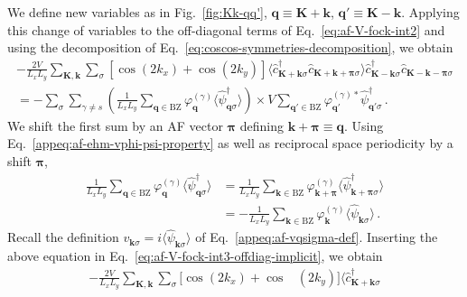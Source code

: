 \begin{tabproof}
	
	We define new variables as in Fig.~\ref{fig:Kk-qq'}, $\mathbf{q}\equiv\mathbf{K}+\mathbf{k}$, $\mathbf{q}'\equiv\mathbf{K}-\mathbf{k}$.
	Applying this change of variables to the off-diagonal terms of Eq.~\eqref{eq:af-V-fock-int2} and using the decomposition of Eq.~\eqref{eq:coscos-symmetries-decomposition}, we obtain
	\begin{multline}
		-\frac{2V}{L_x L_y} \sum_{\mathbf{K}, \mathbf{k}} \sum_\sigma [
		\cos \left(
		2k_x
		\right)	+ \cos \left(
		2k_y
		\right)	
		] \langle
		\hat c_{\mathbf{K}+\mathbf{k} \sigma}^\dagger 
		\hat c_{\mathbf{K}+\mathbf{k}+\bm{\pi} \sigma}
		\rangle
		\hat c_{\mathbf{K}-\mathbf{k} \sigma}^\dagger \hat c_{\mathbf{K}-\mathbf{k}-\bm{\pi} \sigma} \\
		= -\sum_\sigma \sum_{\gamma \neq s} \left(
		\frac{1}{L_x L_y} \sum_{\mathbf{q}\in\mathrm{BZ}} \varphi_\mathbf{q}^{(\gamma)}
		\langle
		\hat \psi_{\mathbf{q}\sigma}^\dagger
		\rangle
		\right) \times V
		\sum_{\mathbf{q}'\in\mathrm{BZ}}
		\varphi_{\mathbf{q}'}^{(\gamma)*}
		\hat \psi_{\mathbf{q}'\sigma}^\dagger \, . \label{eq:af-V-fock-int3-offdiag-implicit}
	\end{multline}
	We shift the first sum by an AF vector $\bm{\pi}$ defining $\mathbf{k}+\bm{\pi}\equiv\mathbf{q}$. Using Eq.~\eqref{appeq:af-ehm-vphi-psi-property} as well as reciprocal space periodicity by a shift $\bm{\pi}$,
	\[
	\begin{aligned}
		\frac{1}{L_x L_y} \sum_{\mathbf{q}\in\mathrm{BZ}} \varphi_\mathbf{q}^{(\gamma)}
		\langle
		\hat \psi_{\mathbf{q}\sigma}^\dagger
		\rangle &= \frac{1}{L_x L_y} \sum_{\mathbf{k}\in\mathrm{BZ}} \varphi_{\mathbf{k}+\bm{\pi}}^{(\gamma)}
		\langle
		\hat \psi_{\mathbf{k}+\bm{\pi}\sigma}^\dagger
		\rangle \\
		&= - \frac{1}{L_x L_y} \sum_{\mathbf{k}\in\mathrm{BZ}} \varphi_\mathbf{k}^{(\gamma)}
		\langle
		\hat \psi_{\mathbf{k}\sigma}
		\rangle \, .
	\end{aligned}
	\]
	Recall the definition $v_{\mathbf{k}\sigma} = i\langle \hat \psi_{\mathbf{k}\sigma} \rangle$ of Eq.~\eqref{appeq:af-vqsigma-def}. Inserting the above equation in Eq.~\eqref{eq:af-V-fock-int3-offdiag-implicit}, we obtain
	\begin{align}
		-\frac{2V}{L_x L_y} \sum_{\mathbf{K}, \mathbf{k}} \sum_\sigma [
		\cos \left(
		2k_x
		\right)	+ \cos &\left(
		2k_y
		\right)	
		] \langle
		\hat c_{\mathbf{K}+\mathbf{k} \sigma}^\dagger 

\end{align}
\end{tabproof}
